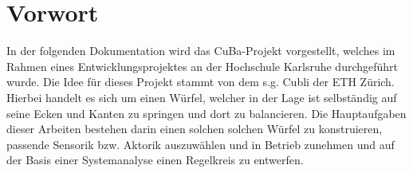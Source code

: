 \section*{Vorwort}
In der folgenden Dokumentation wird das \ac{CuBa}-Projekt vorgestellt, welches im Rahmen eines Entwicklungsprojektes an der Hochschule Karlsruhe durchgeführt wurde. Die Idee für dieses Projekt stammt von dem s.g. Cubli der ETH Zürich. Hierbei handelt es sich um einen Würfel, welcher in der Lage ist selbständig auf seine Ecken und Kanten zu springen und dort zu balancieren. Die Hauptaufgaben dieser Arbeiten bestehen darin einen solchen solchen Würfel zu konstruieren, passende Sensorik bzw. Aktorik auszuwählen und in Betrieb zunehmen und auf der Basis einer Systemanalyse einen Regelkreis zu entwerfen. 